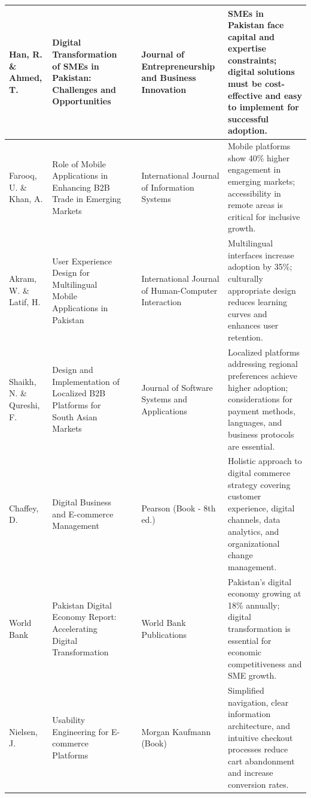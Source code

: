 \begin{longtable}{|>{\raggedright}p{1.8cm}|>{\raggedright}p{3cm}|>{\centering}p{0.8cm}|>{\raggedright}p{2cm}|>{\raggedright\arraybackslash}p{4.5cm}|}
Han, R. \& Ahmed, T. & Digital Transformation of SMEs in Pakistan: Challenges and Opportunities\cite{han2023digital} & 2023 & Journal of Entrepreneurship and Business Innovation & SMEs in Pakistan face capital and expertise constraints; digital solutions must be cost-effective and easy to implement for successful adoption. \\
\hline

Farooq, U. \& Khan, A. & Role of Mobile Applications in Enhancing B2B Trade in Emerging Markets\cite{farooq2024mobile} & 2024 & International Journal of Information Systems & Mobile platforms show 40\% higher engagement in emerging markets; accessibility in remote areas is critical for inclusive growth. \\
\hline

Akram, W. \& Latif, H. & User Experience Design for Multilingual Mobile Applications in Pakistan\cite{akram2022user} & 2022 & International Journal of Human-Computer Interaction & Multilingual interfaces increase adoption by 35\%; culturally appropriate design reduces learning curves and enhances user retention. \\
\hline

Shaikh, N. \& Qureshi, F. & Design and Implementation of Localized B2B Platforms for South Asian Markets\cite{shaikh2024design} & 2024 & Journal of Software Systems and Applications & Localized platforms addressing regional preferences achieve higher adoption; considerations for payment methods, languages, and business protocols are essential. \\
\hline

Chaffey, D. & Digital Business and E-commerce Management\cite{chaffey2022digital} & 2022 & Pearson (Book - 8th ed.) & Holistic approach to digital commerce strategy covering customer experience, digital channels, data analytics, and organizational change management. \\
\hline

World Bank & Pakistan Digital Economy Report: Accelerating Digital Transformation\cite{worldbank2023pakistan} & 2023 & World Bank Publications & Pakistan's digital economy growing at 18\% annually; digital transformation is essential for economic competitiveness and SME growth. \\
\hline

Nielsen, J. & Usability Engineering for E-commerce Platforms\cite{nielsen2020usability} & 2020 & Morgan Kaufmann (Book) & Simplified navigation, clear information architecture, and intuitive checkout processes reduce cart abandonment and increase conversion rates. \\
\hline


\end{longtable}
